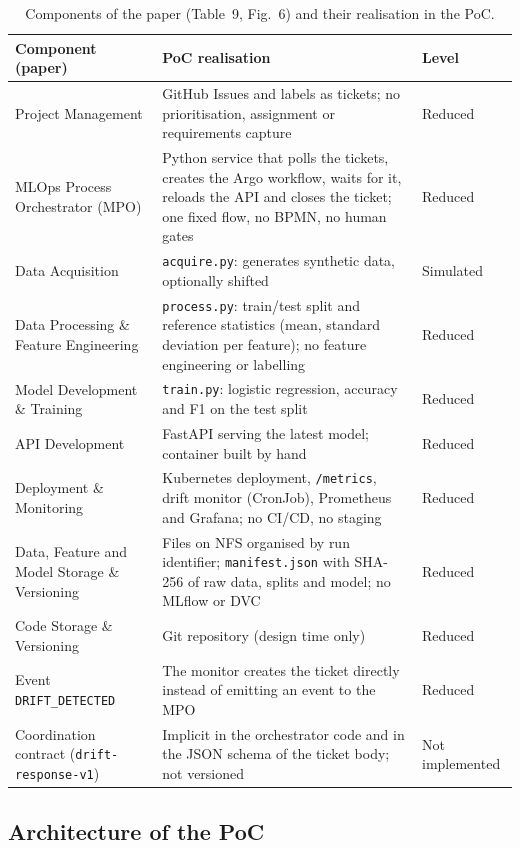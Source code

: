 \begin{table}[t]
\centering
\caption{Components of the paper (Table~9, Fig.~6) and their realisation in the PoC.}
\label{tab:poc-mapping}
\small
\begin{tabularx}{\textwidth}{@{}>{\raggedright\arraybackslash}p{3.6cm} X >{\raggedright\arraybackslash}p{2.6cm}@{}}
\toprule
Component (paper) & PoC realisation & Level \\
\midrule
Project Management & GitHub Issues and labels as tickets; no prioritisation, assignment or requirements capture & Reduced \\
MLOps Process Orchestrator (MPO) & Python service that polls the tickets, creates the Argo workflow, waits for it, reloads the API and closes the ticket; one fixed flow, no BPMN, no human gates & Reduced \\
Data Acquisition & \texttt{acquire.py}: generates synthetic data, optionally shifted & Simulated \\
Data Processing \& Feature Engineering & \texttt{process.py}: train/test split and reference statistics (mean, standard deviation per feature); no feature engineering or labelling & Reduced \\
Model Development \& Training & \texttt{train.py}: logistic regression, accuracy and F1 on the test split & Reduced \\
API Development & FastAPI serving the latest model; container built by hand & Reduced \\
Deployment \& Monitoring & Kubernetes deployment, \texttt{/metrics}, drift monitor (CronJob), Prometheus and Grafana; no CI/CD, no staging & Reduced \\
Data, Feature and Model Storage \& Versioning & Files on NFS organised by run identifier; \texttt{manifest.json} with SHA-256 of raw data, splits and model; no MLflow or DVC & Reduced \\
Code Storage \& Versioning & Git repository (design time only) & Reduced \\
Event \texttt{DRIFT\_DETECTED} & The monitor creates the ticket directly instead of emitting an event to the MPO & Reduced \\
Coordination contract (\texttt{drift-response-v1}) & Implicit in the orchestrator code and in the JSON schema of the ticket body; not versioned & Not implemented \\
\bottomrule
\end{tabularx}
\end{table}

\subsection{Architecture of the PoC}

